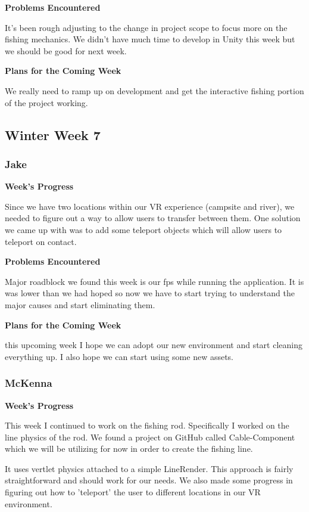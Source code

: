 \documentclass[10pt,journal,compsoc,onecolumn, draftclsnofoot]{IEEEtran}
\begin{document}
\noindent \textbf{Problems Encountered}

It's been rough adjusting to the change in project scope to focus more on the fishing mechanics. We didn't have much time to develop in Unity this week but we should be good for next week.

\noindent \textbf{Plans for the Coming Week}

We really need to ramp up on development and get the interactive fishing portion of the project working.

\subsection{Winter Week 7}
\subsubsection{Jake}
\noindent \textbf{Week's Progress}

Since we have two locations within our VR experience (campsite and river), we needed to figure out a way to allow users to transfer between them. One solution we came up with was to add some teleport objects which will allow users to teleport on contact.

\noindent \textbf{Problems Encountered}

Major roadblock we found this week is our fps while running the application. It is was lower than we had hoped so now we have to start trying to understand the major causes and start eliminating them.

\noindent \textbf{Plans for the Coming Week}

this upcoming week I hope we can adopt our new environment and start cleaning everything up. I also hope we can start using some new assets.

\subsubsection{McKenna}
\noindent \textbf{Week's Progress}

This week I continued to work on the fishing rod. Specifically I worked on the line physics of the rod. We found a project on GitHub called Cable-Component which we will be utilizing for now in order to create the fishing line.

It uses vertlet physics attached to a simple LineRender. This approach is fairly straightforward and should work for our needs. We also made some progress in figuring out how to 'teleport' the user to different locations in our VR environment.
\end{document}
